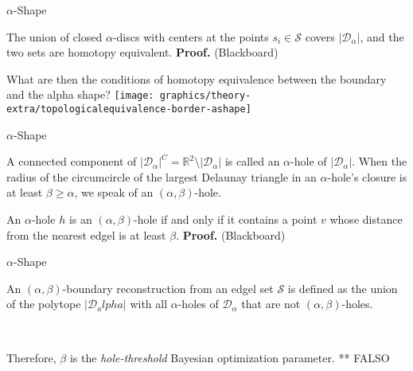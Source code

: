     \begin{frame}{$\alpha$-Shape}
         {
            \begin{lemma}
                The union of closed $\alpha$-discs with centers at the points $s_i \in \mathcal{S}$ covers $\lvert \mathcal{D}_\alpha \rvert$, and the two sets are homotopy equivalent.\newline
                \textbf{Proof.} (Blackboard)
            \end{lemma}
        }
         {
            What are then the conditions of homotopy equivalence between the boundary and the alpha shape?
        }
         {
            \texttt{[image: graphics/theory-extra/topologicalequivalence-border-ashape]}
        }
    \end{frame}

    \begin{frame}{$\alpha$-Shape}
         {
            \begin{definition}
                A connected component of $\lvert\mathcal{D}_\alpha\rvert^C = \mathbb{R}^2 \setminus \lvert \mathcal{D}_\alpha \rvert$ is called an $\alpha$-hole of $\lvert\mathcal{D}_\alpha\rvert$. When the radius of the circumcircle of the largest Delaunay triangle in an $\alpha$-hole’s closure is at least $\beta \geq \alpha$, we speak of an $\left(\alpha, \beta\right)$-hole.
            \end{definition}
        }
         {
            \begin{lemma}
                An $\alpha$-hole $h$ is an $\left(\alpha,\beta\right)$-hole if and only if it contains a point $v$ whose distance from the nearest edgel is at least $\beta$.\newline
                \textbf{Proof.} (Blackboard)
            \end{lemma}
        }
    \end{frame}

    \begin{frame}{$\alpha$-Shape}
         {
            \begin{definition}
                An $\left(\alpha,\beta\right)$-boundary reconstruction from an edgel set $\mathcal{S}$ is defined as the union of the polytope $\lvert\mathcal{D}_alpha\rvert$ with all $\alpha$-holes of $\mathcal{D}_\alpha$ that are not $\left(\alpha,\beta\right)$-holes.
            \end{definition}
        }
         {
            \begin{remark}
                Therefore, $\beta$ is the \textit{hole-threshold} Bayesian optimization parameter. ** FALSO
            \end{remark}
        }
    \end{frame}

